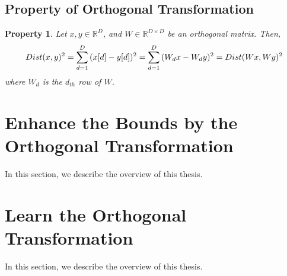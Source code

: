\subsection{Property of Orthogonal Transformation}
\label{ss:ortho_prop}
\newtheorem{ProOfOrthogonal}{\bf Property}
\begin{ProOfOrthogonal}
Let $x, y\in\mathbb{R}^{D}$, and $W\in\mathbb{R}^{D\times D}$ be an orthogonal matrix. Then,
\[
Dist(x,y)^2=\sum^D_{d=1}{(x[d]-y[d])^2} \\
=\sum^D_{d=1}{(W_dx-W_dy)^2}=Dist(Wx,Wy)^2
\]
where $W_d$ is the $d_{th}$ row of $W$.
\end{ProOfOrthogonal}

\section{Enhance the Bounds by the Orthogonal Transformation}
\label{s:ortho_bounds}
In this section, we describe the overview of this thesis.

\section{Learn the Orthogonal Transformation}
\label{s:ortho_learn}
In this section, we describe the overview of this thesis.



%
%
